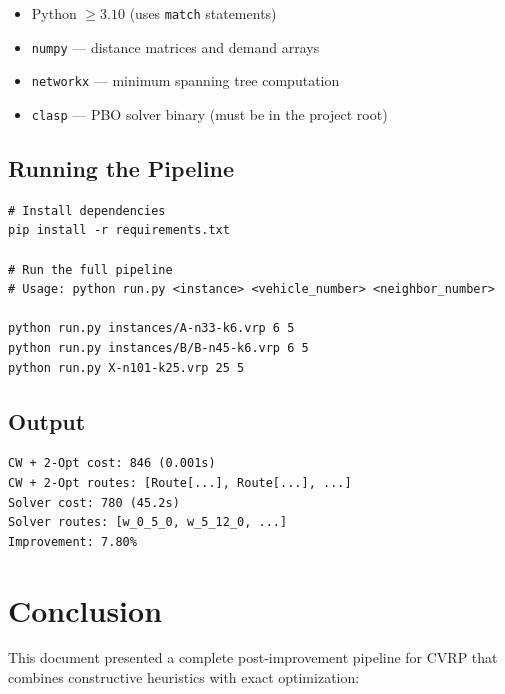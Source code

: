 \documentclass[12pt,a4paper]{article}
\theoremstyle{definition}
\begin{document}
\begin{itemize}
    \item Python $\geq 3.10$ (uses \texttt{match} statements)
    \item \texttt{numpy} --- distance matrices and demand arrays
    \item \texttt{networkx} --- minimum spanning tree computation
    \item \texttt{clasp} --- PBO solver binary (must be in the project root)
\end{itemize}

\subsection{Running the Pipeline}

\begin{verbatim}
# Install dependencies
pip install -r requirements.txt

# Run the full pipeline
# Usage: python run.py <instance> <vehicle_number> <neighbor_number>

python run.py instances/A-n33-k6.vrp 6 5
python run.py instances/B/B-n45-k6.vrp 6 5
python run.py X-n101-k25.vrp 25 5
\end{verbatim}

\subsection{Output}

\begin{verbatim}
CW + 2-Opt cost: 846 (0.001s)
CW + 2-Opt routes: [Route[...], Route[...], ...]
Solver cost: 780 (45.2s)
Solver routes: [w_0_5_0, w_5_12_0, ...]
Improvement: 7.80%
\end{verbatim}

\section{Conclusion}

This document presented a complete post-improvement pipeline for CVRP that combines constructive heuristics with exact optimization:
\end{document}
